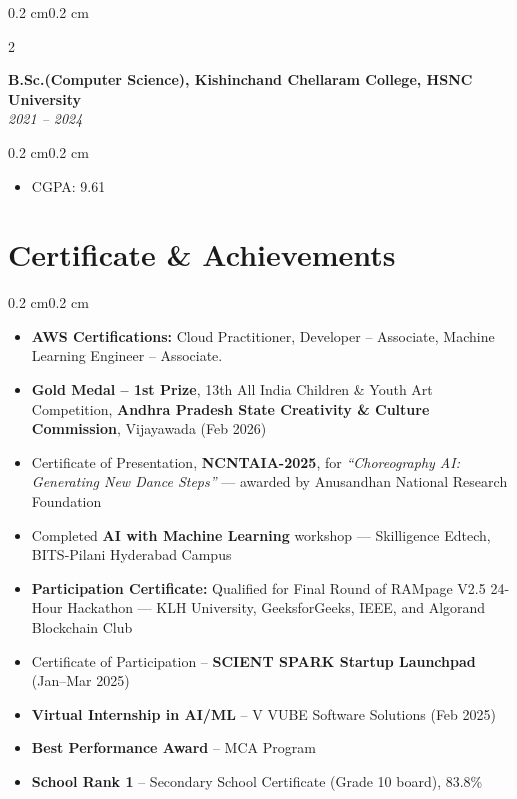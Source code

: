 \documentclass[10pt, a4paper]{article}
\newenvironment{highlights}{
    \begin{itemize}[
        topsep=0.10 cm,
        parsep=0.10 cm,
        partopsep=0pt,
        itemsep=0pt,
        leftmargin=0.4 cm + 10pt
    ]
}{\end{itemize}}
\newenvironment{onecolentry}{
    \begin{adjustwidth}{0.2 cm}{0.2 cm}
}{\end{adjustwidth}}
\newenvironment{twocolentry}[2][]{
    \onecolentry
    \def\secondColumn{#2}
    \setcolumnwidth{\fill, 4.5 cm}
    \begin{paracol}{2}
}{
    \switchcolumn \raggedleft \secondColumn
    \end{paracol}
    \endonecolentry
}
\begin{document}
\vspace{0.50 cm}   %

\begin{twocolentry}{\textit{2021 – 2024}}
    \textbf{B.Sc.(Computer Science), Kishinchand Chellaram College, HSNC University} \\
  
\end{twocolentry}
\begin{onecolentry}
    \begin{highlights}
        \item CGPA: 9.61
    \end{highlights}
\end{onecolentry}

\section{Certificate \& Achievements}

\begin{onecolentry}
    \begin{highlights}
    \item \textbf{AWS Certifications:} Cloud Practitioner, Developer -- Associate, Machine Learning Engineer -- Associate.
\item \textbf{Gold Medal – 1st Prize}, 13th All India Children \& Youth Art Competition, \textbf{Andhra Pradesh State Creativity \& Culture Commission}, Vijayawada (Feb 2026)
\item Certificate of Presentation, \textbf{NCNTAIA-2025}, for \textit{``Choreography AI: Generating New Dance Steps''} — awarded by Anusandhan National Research Foundation
\item Completed \textbf{AI with Machine Learning} workshop — Skilligence Edtech, BITS-Pilani Hyderabad Campus
\item \textbf{Participation Certificate:} Qualified for Final Round of RAMpage V2.5 24-Hour Hackathon — KLH University, GeeksforGeeks, IEEE, and Algorand Blockchain Club
\item Certificate of Participation – \textbf{SCIENT SPARK Startup Launchpad} (Jan–Mar 2025)
\item \textbf{Virtual Internship in AI/ML} – V VUBE Software Solutions (Feb 2025)
\item \textbf{Best Performance Award} – MCA Program
\item \textbf{School Rank 1} – Secondary School Certificate (Grade 10 board), 83.8\%
    \end{highlights}
\end{onecolentry}
\end{document}
